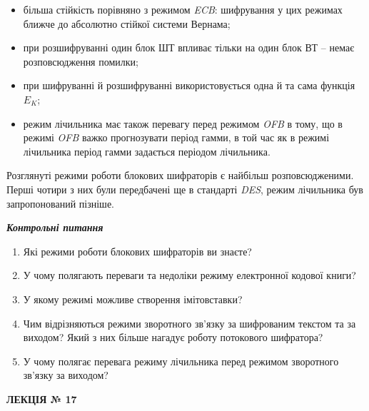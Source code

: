 \documentclass[a4paper]{article}
\newcommand\liststyleWWviiiNumxxvii{%
\renewcommand\labelitemi{\textlatin{[F0B7?]}}
\renewcommand\labelitemii{o}
\renewcommand\labelitemiii{\textlatin{[F0A7?]}}
\renewcommand\labelitemiv{\textlatin{[F0B7?]}}
}
\newcommand\liststyleWWviiiNumxx{%
\renewcommand\theenumi{\arabic{enumi}}
\renewcommand\theenumii{\alph{enumii}}
\renewcommand\theenumiii{\roman{enumiii}}
\renewcommand\theenumiv{\arabic{enumiv}}
\renewcommand\labelenumi{\theenumi.}
\renewcommand\labelenumii{\theenumii.}
\renewcommand\labelenumiii{\theenumiii.}
\renewcommand\labelenumiv{\theenumiv.}
}
\newcounter{}
\begin{document}
\liststyleWWviiiNumxxvii
\begin{itemize}
\item більша стійкість порівняно з режимом \textit{ECB}: шифрування у цих
режимах ближче до абсолютно стійкої системи Вернама;
\item при розшифруванні один блок ШТ впливає тільки на один блок ВТ – немає
розповсюдження помилки;
\item при шифруванні й розшифруванні використовується одна й та сама функція 
${E_{{K}}}$;
\item режим лічильника має також перевагу перед режимом \textit{OFB} в тому, що
в режимі \textit{OFB}\textit{ }важко прогнозувати період гамми, в той час як в
режимі лічильника період гамми задається періодом лічильника.
\end{itemize}

\bigskip

Розглянуті режими роботи блокових шифраторів є найбільш розповсюдженими. Перші
чотири з них були передбачені ще в стандарті \textit{DES}, режим
лічильника\textit{ }був запропонований пізніше.


\bigskip


\bigskip

{\centering\bfseries\itshape
Контрольні питання
\par}


\bigskip


\bigskip

\liststyleWWviiiNumxx
\begin{enumerate}
\item Які режими роботи блокових шифраторів ви знаєте?
\item У чому полягають переваги та недоліки режиму електронної кодової книги?
\item У якому режимі можливе створення імітовставки?
\item Чим відрізняються режими зворотного зв’язку за шифрованим текстом та за
виходом? Який з них більше нагадує роботу потокового шифратора?
\item У чому полягає перевага режиму лічильника перед режимом  зворотного
зв’язку за виходом?
\end{enumerate}

\bigskip


\bigskip


\bigskip


\bigskip

{\bfseries
ЛЕКЦІЯ № 17}


\bigskip
\end{document}
